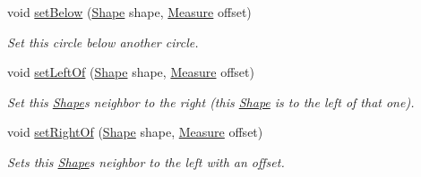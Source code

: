 \begin{DoxyCompactItemize}
void \hyperlink{classcom_1_1aarrelaakso_1_1drawl_1_1_shape_aa0dd6332c22877c42b8c3863e5cc579e}{set\+Below} (\hyperlink{classcom_1_1aarrelaakso_1_1drawl_1_1_shape}{Shape} shape, \hyperlink{classcom_1_1aarrelaakso_1_1drawl_1_1_measure}{Measure} offset)
\begin{DoxyCompactList}\small\item\em Set this circle below another circle. \end{DoxyCompactList}\item 
void \hyperlink{classcom_1_1aarrelaakso_1_1drawl_1_1_shape_aa1f77ee3e24986329b3618b76b2d12be}{set\+Left\+Of} (\hyperlink{classcom_1_1aarrelaakso_1_1drawl_1_1_shape}{Shape} shape, \hyperlink{classcom_1_1aarrelaakso_1_1drawl_1_1_measure}{Measure} offset)
\begin{DoxyCompactList}\small\item\em Set this \hyperlink{classcom_1_1aarrelaakso_1_1drawl_1_1_shape}{Shape}\textquotesingle{}s neighbor to the right (this \hyperlink{classcom_1_1aarrelaakso_1_1drawl_1_1_shape}{Shape} is to the left of that one). \end{DoxyCompactList}\item 
void \hyperlink{classcom_1_1aarrelaakso_1_1drawl_1_1_shape_a5bdc7b20e5863cf6c83a8abe57ce1399}{set\+Right\+Of} (\hyperlink{classcom_1_1aarrelaakso_1_1drawl_1_1_shape}{Shape} shape, \hyperlink{classcom_1_1aarrelaakso_1_1drawl_1_1_measure}{Measure} offset)
\begin{DoxyCompactList}\small\item\em Sets this \hyperlink{classcom_1_1aarrelaakso_1_1drawl_1_1_shape}{Shape}\textquotesingle{}s neighbor to the left with an offset. \end{DoxyCompactList}\end{DoxyCompactItemize}
